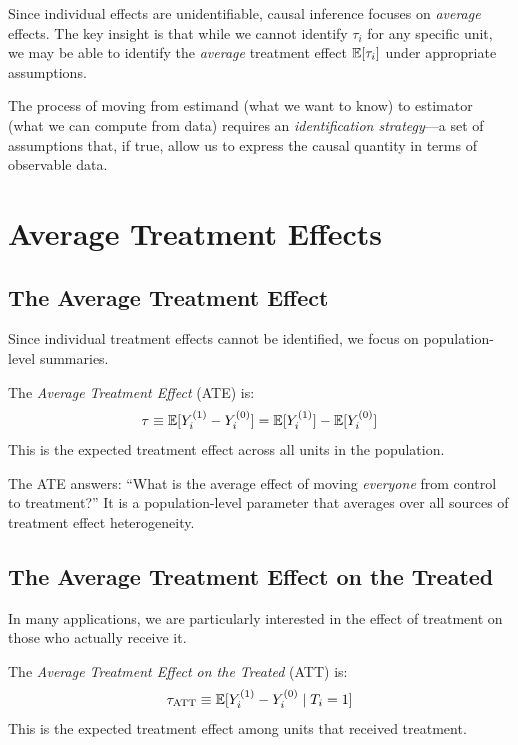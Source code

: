 Since individual effects are unidentifiable, causal inference focuses on \emph{average} effects. The key insight is that while we cannot identify $\tau_i$ for any specific unit, we may be able to identify the \emph{average} treatment effect $\mathbb{E}[\tau_i]$ under appropriate assumptions.

The process of moving from estimand (what we want to know) to estimator (what we can compute from data) requires an \emph{identification strategy}---a set of assumptions that, if true, allow us to express the causal quantity in terms of observable data.


\section{Average Treatment Effects}
\label{sec:ate}

\subsection{The Average Treatment Effect}

Since individual treatment effects cannot be identified, we focus on population-level summaries.

\begin{definition}
\label{def:ate}
The \emph{Average Treatment Effect} (ATE) is:
\begin{equation}
\tau \equiv \mathbb{E}[Y^{(1)}_i - Y^{(0)}_i] = \mathbb{E}[Y^{(1)}_i] - \mathbb{E}[Y^{(0)}_i]
\label{eq:ate}
\end{equation}
This is the expected treatment effect across all units in the population.
\end{definition}

The ATE answers: ``What is the average effect of moving \emph{everyone} from control to treatment?'' It is a population-level parameter that averages over all sources of treatment effect heterogeneity.

\subsection{The Average Treatment Effect on the Treated}

In many applications, we are particularly interested in the effect of treatment on those who actually receive it.

\begin{definition}
\label{def:att}
The \emph{Average Treatment Effect on the Treated} (ATT) is:
\begin{equation}
\tau_{\text{ATT}} \equiv \mathbb{E}[Y^{(1)}_i - Y^{(0)}_i \mid T_i = 1]
\label{eq:att}
\end{equation}
This is the expected treatment effect among units that received treatment.
\end{definition}

